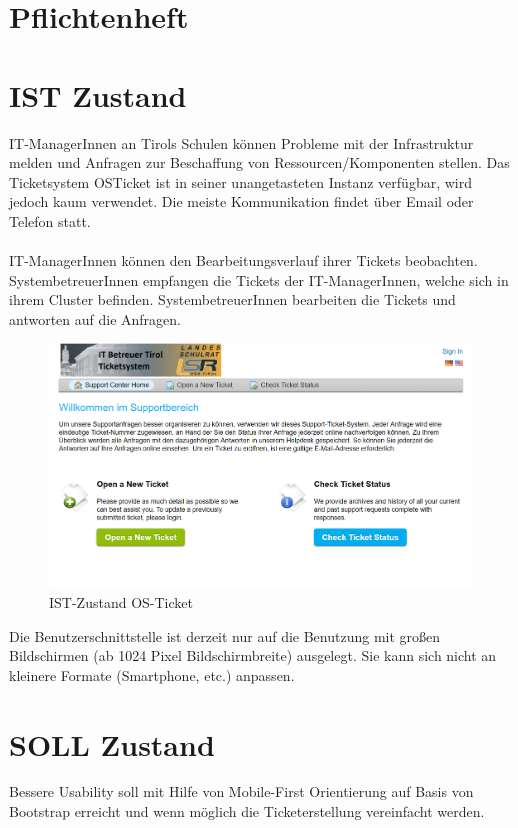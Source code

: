 \newpage
\section{Pflichtenheft}
\section{IST Zustand}
IT-ManagerInnen an Tirols Schulen können Probleme mit der Infrastruktur melden und Anfragen zur Beschaffung von Ressourcen/Komponenten stellen. Das Ticketsystem OSTicket ist in seiner unangetasteten Instanz verfügbar, wird jedoch kaum verwendet. Die meiste Kommunikation findet über Email oder Telefon statt.
\paragraph{}
IT-ManagerInnen können den Bearbeitungsverlauf ihrer Tickets beobachten. SystembetreuerInnen empfangen die Tickets der IT-ManagerInnen, welche sich in ihrem Cluster befinden. SystembetreuerInnen bearbeiten die Tickets und antworten auf die Anfragen.

\begin{figure}[h]
	\centering
	\includegraphics[scale=0.7]{figures/Ist_Login.png}
	\caption{IST-Zustand OS-Ticket}
	\label{Abb_IST-Zustand}
\end{figure}
\noindent Die Benutzerschnittstelle ist derzeit nur auf die Benutzung mit großen Bildschirmen (ab 1024 Pixel Bildschirmbreite) ausgelegt. Sie kann sich nicht an kleinere Formate (Smartphone, etc.) anpassen.

\section{SOLL Zustand}
Bessere Usability soll mit Hilfe von Mobile-First Orientierung auf Basis von Bootstrap erreicht und wenn möglich die Ticketerstellung vereinfacht werden.
